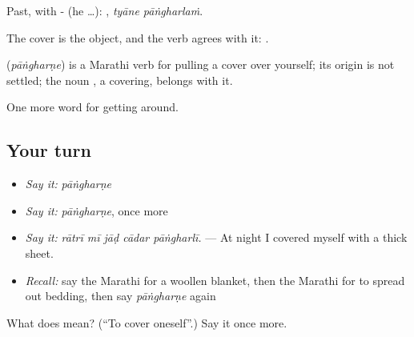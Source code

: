 Past, with - (he …):  , \emph{tyāne pāṅgharlaṁ}.

The cover is the object, and the verb agrees with it:  .

\begin{cousinweb}
\textbf{} (\emph{pāṅgharṇe}) is a Marathi verb for pulling a cover over yourself; its origin is not settled; the noun \textbf{}, a covering, belongs with it.
\end{cousinweb}

\begin{grammarlens}[title={What you've built}]
One more word for getting around.
\end{grammarlens}

\subsection*{Your turn}
\begin{itemize}
\raggedright
  \item \emph{Say it:} \emph{pāṅgharṇe}
  \item \emph{Say it:} \emph{pāṅgharṇe}, once more
  \item \emph{Say it:} \emph{rātrī mī jāḍ cādar pāṅgharlī.} — At night I covered myself with a thick sheet.
  \item \emph{Recall:} say the Marathi for a woollen blanket, then the Marathi for to spread out bedding, then say \emph{pāṅgharṇe} again
\end{itemize}

\begin{tcolorbox}[breakable,colback=teal!4,colframe=teal!35!black,title={Before you move on}]
What does  mean? (\textquotedblleft{}To cover oneself\textquotedblright{}.) Say it once more.
\end{tcolorbox}
